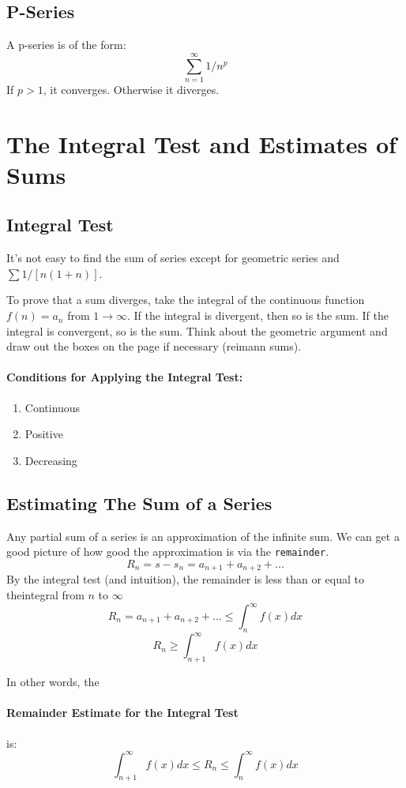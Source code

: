 \documentclass[a4paper,12pt]{report}
\begin{document}
\subsection{P-Series}
A p-series is of the form: $$\sum_{n=1}^{\infty} 1/{n^p}$$
If $p > 1$, it converges. Otherwise it diverges.

\section{The Integral Test and Estimates of Sums}
\subsection{Integral Test}
It's not easy to find the sum of series except for geometric series and $\sum 1/[n(1+n)]$. 

To prove that a sum diverges, take the integral of the continuous function $f(n) = a_n$ from $1 \to \infty$. If the integral is divergent, then so is the sum. If the integral is convergent, so is the sum. Think about the geometric argument and draw out the boxes on the page if necessary (reimann sums). 

\paragraph{Conditions for Applying the Integral Test: }
\begin{enumerate}
\item Continuous
\item Positive
\item Decreasing
\end{enumerate}

\subsection{Estimating The Sum of a Series}
Any partial sum of a series is an approximation of the infinite sum. We can get a good picture of how good the approximation is via the \texttt{remainder}.
$$R_n = s - s_n = a_{n+1} + a_{n+2} + ...$$
By the integral test (and intuition), the remainder is less than or equal to theintegral from $n$ to $\infty$
$$R_n = a_{n+1} + a_{n+2} + ... \leq \int_n^{\infty}f(x)dx$$
$$R_n \geq \int_{n+1}^{\infty}f(x)dx$$

In other words, the \paragraph{Remainder Estimate for the Integral Test} is:
$$ \int_{n+1}^{\infty}f(x) dx \leq R_n \leq \int_n^{\infty}f(x) dx$$
\end{document}
